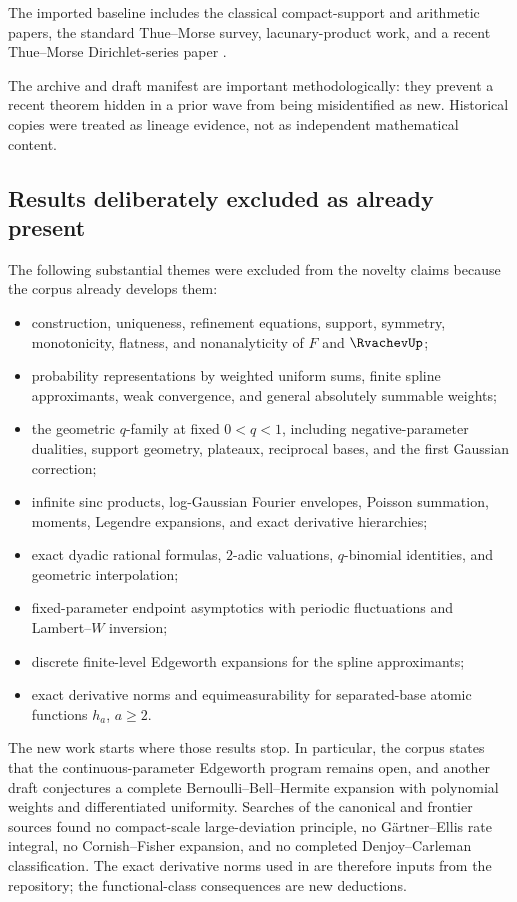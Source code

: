 \documentclass[11pt]{article}
\numberwithin{equation}{section}
\theoremstyle{definition}
\begin{document}
The imported baseline includes the classical compact-support and arithmetic papers, the standard Thue--Morse survey, lacunary-product work, and a recent Thue--Morse Dirichlet-series paper \cite{Arias1982,Arias2017,AlloucheShallit,AistleitnerParametric,AistleitnerEvil,Toth}.

The archive and draft manifest are important methodologically: they prevent a recent theorem hidden in a prior wave from being misidentified as new.  Historical copies were treated as lineage evidence, not as independent mathematical content.

\subsection{Results deliberately excluded as already present}
The following substantial themes were excluded from the novelty claims because the corpus already develops them:
\begin{itemize}
\item construction, uniqueness, refinement equations, support, symmetry, monotonicity, flatness, and nonanalyticity of \(F\) and \(\RvachevUp\);
\item probability representations by weighted uniform sums, finite spline approximants, weak convergence, and general absolutely summable weights;
\item the geometric \(q\)-family at fixed \(0<q<1\), including negative-parameter dualities, support geometry, plateaux, reciprocal bases, and the first Gaussian correction;
\item infinite sinc products, log-Gaussian Fourier envelopes, Poisson summation, moments, Legendre expansions, and exact derivative hierarchies;
\item exact dyadic rational formulas, \(2\)-adic valuations, \(q\)-binomial identities, and geometric interpolation;
\item fixed-parameter endpoint asymptotics with periodic fluctuations and Lambert--\(W\) inversion;
\item discrete finite-level Edgeworth expansions for the spline approximants;
\item exact derivative norms and equimeasurability for separated-base atomic functions \(h_a\), \(a\ge2\).
\end{itemize}

The new work starts where those results stop.  In particular, the corpus states that the continuous-parameter Edgeworth program remains open, and another draft conjectures a complete Bernoulli--Bell--Hermite expansion with polynomial weights and differentiated uniformity.  Searches of the canonical and frontier sources found no compact-scale large-deviation principle, no G\"artner--Ellis rate integral, no Cornish--Fisher expansion, and no completed Denjoy--Carleman classification.  The exact derivative norms used in  are therefore inputs from the repository; the functional-class consequences are new deductions.
\end{document}
